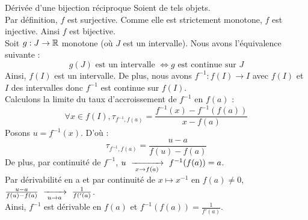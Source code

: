 \documentclass{article}
\begin{document}
\begin{question_kholle}
	[Soit $f : I \rightarrow f(I) \subset \R$ continue, strictement monotone sur $I$ et dérivable en $a \in I$.\\
		Si $f'(a) \neq 0$ alors $f$ est bijective, $f^{-1}$ est dérivable en $f(a)$ et $f^{-1}(f(a)) = \displaystyle\frac{1}{f'(a)}$.]
	{Dérivée d'une bijection réciproque}
	Soient de tels objets. \\
	Par définition, $f$ est surjective. Comme elle est strictement monotone, $f$ est injective. Ainsi $f$ est bijective. \\[4pt]
	Soit $g : J \rightarrow \mathbb R$ monotone (où $J$ est un intervalle). Nous avons l'équivalence suivante :
	\begin{equation*}
		g(J) \text{ est un intervalle } \iff g \text{ est continue sur } J
	\end{equation*}
	Ainsi, $f(I)$ est un intervalle. De plus, nous avons $f^{-1} : f(I) \rightarrow I$ avec $f(I)$ et $I$ des intervalles donc $f^{-1}$ est continue sur $f(I)$. \\
	Calculons la limite du taux d'accroissement de $f^{-1}$ en $f(a)$ :
	\begin{equation*}
		\forall x \in f(I), \tau_{f^{-1},f(a)} = \frac{f^{-1}(x) - f^{-1}(f(a))}{x - f(a)}
	\end{equation*}
	Posons $u = f^{-1}(x)$. D'où :
	\begin{equation*}
		\tau_{f^{-1},f(a)} = \frac{u - a}{f(u) - f(a)}
	\end{equation*}
	De plus, par continuité de $f^{-1}$, $u \ \xrightarrow[\;x \to f(a)\;]{}\  f^{-1}(f(a)) = a$.\\
	Par dérivabilité en a et par continuité de $x \mapsto x^{-1}$ en $f(a) \neq 0$, $\frac{u - a}{f(u) - f(a)} \ \xrightarrow[\;u \to a\;]{}\  \frac{1}{f('(a)}$. \\
	Ainsi, $f^{-1}$ est dérivable en $f(a)$ et $f^{-1}(f(a)) = \frac{1}{f'(a)}$.
\end{question_kholle}
\end{document}
